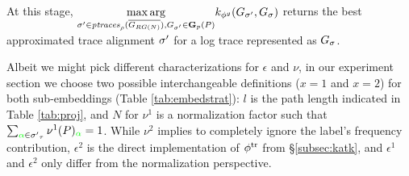 At this stage, $\underset{\nonlogtrace\in \WCal{\pmin}{n}, G_\nonlogtrace\in\TBf{p}{n}(P)}{\max\arg} k_{\gorgembed}(G_\nonlogtrace, G_{\logtrace})$ returns the best approximated trace alignment $\nonlogtrace$ for a log trace represented as $G_{\logtrace}$. %

\begin{table}[!t]
	\caption{Different sub-embedding definitions ($\epsilon^1$, $\epsilon^2$, $\nu^1$, and $\nu^2$) for $\gorgembed$.}\label{tab:embedstrat}
	\centering
\end{table}

Albeit we might pick different characterizations for $\epsilon$ and $\nu$, {in our experiment section} we choose two possible interchangeable definitions ($x=1$ and $x=2$) for both sub-embeddings (Table \ref{tab:embedstrat}): $l$ is the path length indicated in Table \ref{tab:proj}, and $N$ for $\nu^1$ is a normalization factor such that $\sum_{{\color{green}\alpha}\in\nonlogtrace_\tau}\nu^1(P)_{\color{green}\alpha}=1$. While $\nu^2$ implies to completely ignore the label's frequency contribution, $\epsilon^2$ is the direct implementation of $\trembed$ from \S\ref{subsec:katk}, and $\epsilon^1$ and $\epsilon^2$ only differ from the normalization perspective. %



